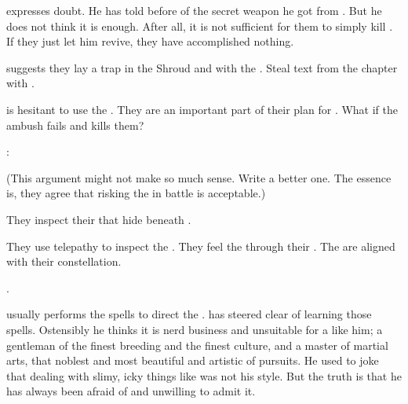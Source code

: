 \begin{comment}
  \section{Urizeth suggests trap}
\end{comment}

\Teshrial expresses doubt.
He has told \Urizeth before of the secret weapon he got from \Azraid.
But he does not think it is enough.
After all, it is not sufficient for them to simply kill \Ishnaruchaefir.
If they just let him revive, they have accomplished nothing. 

\Urizeth suggests they lay a trap in the Shroud and with the \noggyaleth.
Steal text from the chapter with \Azraid. 

\Teshrial is hesitant to use the \noggyaleth.
They are an important part of their plan for \Malcur. 
What if the ambush fails and \Ishnaruchaefir kills them? 

\Urizeth:

(This argument might not make so much sense.
 Write a better one.
 The essence is, they agree that risking the \noggyaleth in battle is acceptable.)



\begin{comment}
  \section{They inspect Nogg-yaleth}
\end{comment}

They inspect their \noggyaleth that hide beneath \Malcur. 

They use telepathy to inspect the \noggyaleth.
They feel the \noggyaleth through their \matrix.
The \noggyaleth are aligned with their constellation. 

\Teshrial {}. 

\Urizeth usually performs the spells to direct the \noggyaleth.
\Teshrial has steered clear of learning those spells. 
Ostensibly he thinks it is nerd business and unsuitable for a \resphan like him; a gentleman of the finest breeding and the finest culture, and a master of martial arts, that noblest and most beautiful and artistic of pursuits. 
He used to joke that dealing with slimy, icky things like \noggyaleth was not his style. 
But the truth is that he has always been afraid of \noggyaleth and unwilling to admit it. 

